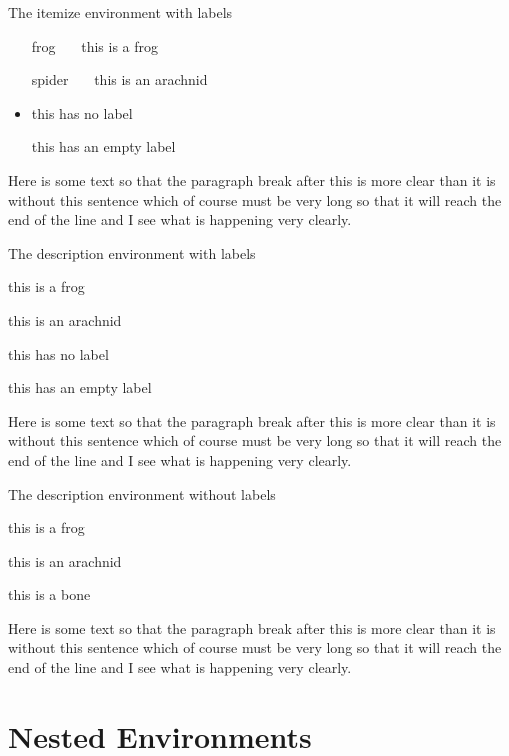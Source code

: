 \documentclass{article}
\begin{document}
The itemize environment with labels
\begin{itemize}
\item[frog~~~] this is a frog
\item[spider~~~] this is an arachnid
\item this has no label
\item[] this has an empty label
\end{itemize}
Here is some text so that the paragraph break after this
is more clear than it is without this sentence which of
course must be very long so that it will reach the end of
the line and I see what is happening very clearly.

The description environment with labels
\begin{description}
\item[frog~~~] this is a frog
\item[spider~~~] this is an arachnid
\item this has no label
\item[] this has an empty label
\end{description}
Here is some text so that the paragraph break after this
is more clear than it is without this sentence which of
course must be very long so that it will reach the end of
the line and I see what is happening very clearly.

The description environment without labels
\begin{description}
\item[] this is a frog
\item[] this is an arachnid
\item this is a bone
\end{description}
Here is some text so that the paragraph break after this
is more clear than it is without this sentence which of
course must be very long so that it will reach the end of
the line and I see what is happening very clearly.

\section{Nested Environments}
\end{document}
